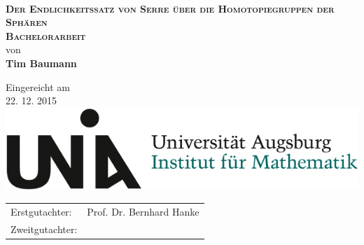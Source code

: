 
\begin{titlepage}
  \begin{center}
    \ \vspace{0.1cm}\\
    \Huge \textbf{\textsc{Der Endlichkeitssatz von Serre über die Homotopiegruppen der Sphären}} \vspace{0.2cm}\\
    \vspace{2cm}
    \LARGE \textbf{\textsc{Bachelorarbeit}}\\
    von\\
    \textbf{Tim Baumann}\\
    \vspace{1.1cm}
    \begin{figure}[htb]
      \centering
    \end{figure}
    \vspace{1.1cm}
    \large Eingereicht am \\
    22. 12. 2015 \\[1cm]
    \includegraphics[scale=0.4]{uni_aux_logo.jpg} \\[1cm]
    \vspace{1.2cm}
    \large \begin{tabular}{ll}
      Erstgutachter: & Prof. Dr. Bernhard Hanke \\
      Zweitgutachter: & \TODO{???}
    \end{tabular}
  \end{center}
\end{titlepage}
